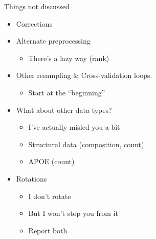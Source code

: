 \documentclass[
  ignorenonframetext,
]{beamer}
\providecommand{\tightlist}{%
  \setlength{\itemsep}{0pt}\setlength{\parskip}{0pt}}
\begin{document}
\begin{frame}{Things not discussed}
\protect\hypertarget{things-not-discussed}{}

\begin{itemize}[<+->]
\tightlist
\item
  Corrections
\item
  Alternate preprocessing

  \begin{itemize}[<+->]
  \tightlist
  \item
    There's a lazy way (rank)
  \end{itemize}
\item
  Other resampling \& Cross-validation loops.

  \begin{itemize}[<+->]
  \tightlist
  \item
    Start at the ``beginning''
  \end{itemize}
\item
  What about other data types?

  \begin{itemize}[<+->]
  \tightlist
  \item
    I've actually misled you a bit
  \item
    Structural data (composition, count)
  \item
    APOE (count)
  \end{itemize}
\item
  Rotations

  \begin{itemize}[<+->]
  \tightlist
  \item
    I don't rotate
  \item
    But I won't stop you from it
  \item
    Report both
  \end{itemize}
\end{itemize}

\end{frame}
\end{document}
